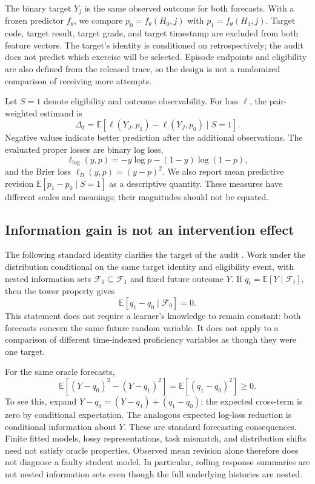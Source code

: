 \documentclass[11pt]{article}
\newcommand{\E}{\mathbb{E}}
\newcommand{\1}{\mathbb{I}}
\begin{document}
The binary target $Y_j$ is the same observed outcome for both forecasts. With a frozen predictor $f_\theta$, we compare $p_0=f_\theta(H_0,j)$ with $p_1=f_\theta(H_1,j)$. Target code, target result, target grade, and target timestamp are excluded from both feature vectors. The target's identity is conditioned on retrospectively; the audit does not predict which exercise will be selected. Episode endpoints and eligibility are also defined from the released trace, so the design is not a randomized comparison of receiving more attempts.

Let $S=1$ denote eligibility and outcome observability. For loss $\ell$, the pair-weighted estimand is
\begin{equation}
 \Delta_\ell=\E\left[\ell(Y_J,p_1)-\ell(Y_J,p_0)\mid S=1\right].
\end{equation}
Negative values indicate better prediction after the additional observations. The evaluated proper losses are binary log loss,
\begin{equation}
 \ell_{\log}(y,p)=-y\log p-(1-y)\log(1-p),
\end{equation}
and the Brier loss $\ell_B(y,p)=(y-p)^2$. We also report mean predictive revision $\E[p_1-p_0\mid S=1]$ as a descriptive quantity. These measures have different scales and meanings; their magnitudes should not be equated.

\subsection{Information gain is not an intervention effect}
The following standard identity clarifies the target of the audit \cite{dawid1982,gneiting2007}. Work under the distribution conditional on the same target identity and eligibility event, with nested information sets $\mathcal F_0\subseteq\mathcal F_1$ and fixed future outcome $Y$. If $q_t=\E[Y\mid\mathcal F_t]$, then the tower property gives
\begin{equation}
 \E[q_1-q_0\mid\mathcal F_0]=0.
\end{equation}
This statement does not require a learner's knowledge to remain constant: both forecasts concern the same future random variable. It does not apply to a comparison of different time-indexed proficiency variables as though they were one target.

For the same oracle forecasts,
\begin{equation}
 \E[(Y-q_0)^2-(Y-q_1)^2]=\E[(q_1-q_0)^2]\ge0.
\end{equation}
To see this, expand $Y-q_0=(Y-q_1)+(q_1-q_0)$; the expected cross-term is zero by conditional expectation. The analogous expected log-loss reduction is conditional information about $Y$. These are standard forecasting consequences. Finite fitted models, lossy representations, task mismatch, and distribution shifts need not satisfy oracle properties. Observed mean revision alone therefore does not diagnose a faulty student model. In particular, rolling response summaries are not nested information sets even though the full underlying histories are nested.
\end{document}

